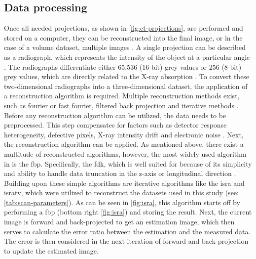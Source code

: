 \subsection{Data processing}\label{s:b-mct-processing}
Once all needed projections, as shown in \cref{fig:ct-projections}, are performed and stored on a computer, they can be reconstructed into the final image, or in the case of a volume dataset, multiple images \cite{liMicrocomputedTomographySmall2008,orhanMicrocomputedTomographyMicroCT2020}.
A single projection can be described as a radiograph, which represents the intensity of the object at a particular angle \cite{liMicrocomputedTomographySmall2008,orhanMicrocomputedTomographyMicroCT2020}.
The radiographs differentiate either 65,536 (16-\gls{bit}) grey values or 256 (8-\gls{bit}) grey values, which are directly related to the X-ray absorption \cite{liMicrocomputedTomographySmall2008,orhanMicrocomputedTomographyMicroCT2020}.
To convert these two-dimensional radiographs into a three-dimensional dataset, the application of a reconstruction algorithm is required.
Multiple reconstruction methods exist, such as fourier or fast fourier, filtered back projection and iterative methods \cite{liMicrocomputedTomographySmall2008,orhanMicrocomputedTomographyMicroCT2020}.
Before any reconstruction algorithm can be utilized, the data needs to be preprocessed.
This step compensates for factors such as detector response heterogeneity, defective pixels, X-ray intensity drift and electronic noise \cite{liMicrocomputedTomographySmall2008}.
Next, the reconstruction algorithm can be applied.
As mentioned above, there exist a multitude of reconstructed algorithms, however,
the most widely used algorithm in \mct\space is the \acrfull{fbp}.
Specifically, the \acrfull{fdk}, which is well suited for \mct\space because of its simplicity
and ability to handle data truncation in the z-axis or longitudinal direction \cite{liMicrocomputedTomographySmall2008,orhanMicrocomputedTomographyMicroCT2020}.
Building upon these simple algorithms are iterative algorithms like the \gls{isra} and \gls{isratv},
which were utilized to reconstruct the datasets used in this study (see: \cref{tab:scan-parameters}).
As can be seen in \cref{fig:isra}, this algorithm starts off by performing a \acrshort{fbp} (bottom right \cref{fig:isra}) and storing the result.
Next, the current image is forward and back-projected to get an estimation image,
which then serves to calculate the error ratio between the estimation and the measured data.
The error is then considered in the next iteration of forward and back-projection to update the estimated image.
